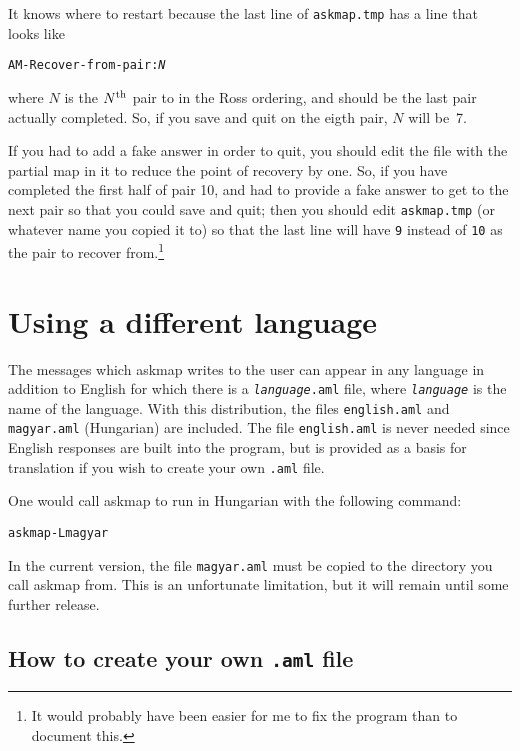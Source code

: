 \documentclass[%
	11pt,
        a4paper,
        twoside]{workrep}
\newcommand*{\prg}[1]{\textsf{#1}}		%
\newcommand*{\file}[1]{\texttt{#1}}		%
\begin{document}
It knows where to restart because the last line of \file{askmap.tmp}
has a line that looks like
\begin{alltt}
AM-Recover-from-pair: \textit{N}
\end{alltt}
where $N$ is the $N^{\rm th}$ pair to in the Ross ordering, and should
be the last pair actually completed.  So, if you save and quit on the
eigth pair, $N$ will be~7.

If you had to add a fake answer in order to quit, you should
edit the file with the partial map in it to reduce the point
of recovery by one.  So, if you have completed the first half of
pair 10, and had to provide a fake answer to get to the next pair so
that you could save and quit; then you should edit \file{askmap.tmp}
(or whatever name you copied it to) so that the last line will
have \texttt{9} instead of \texttt{10} as the pair to recover
from.\footnote{It would probably have been easier for me to fix the program
 than to document this.}

\section{Using a different language}\label{sec:amlfiles}

The messages which askmap writes to the user can appear in any language
in addition to English for which there is a
\texttt{\textit{language}.aml} file, where \texttt{\itshape language}
is the name of the language.  With this distribution, the files
\file{english.aml} and \file{magyar.aml} (Hungarian) are included.
The file \file{english.aml} is
never needed since English responses are built into the
program, but is provided as a basis for translation if you wish
to create your own \file{.aml} file.

One would call \prg{askmap} to run in Hungarian with the following
command:

\begin{alltt}
askmap -L magyar
\end{alltt}

In the current version, the file \file{magyar.aml} must be copied
to the directory you call \prg{askmap} from.
This is an unfortunate limitation,
but it will remain until some further release.

\subsection{How to create your own \file{.aml} file}
\end{document}

